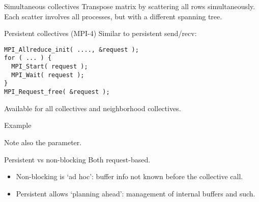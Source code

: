 \begin{numberedframe}{Simultaneous collectives}
  Transpose matrix by scattering all rows simultaneously.\\
  Each scatter involves all processes, but with a
  different spanning tree.

\end{numberedframe}


\begin{numberedframe}{Persistent collectives (MPI-4)}
  Similar to persistent send/recv:
\begin{lstlisting}
MPI_Allreduce_init( ...., &request );
for ( ... ) {
  MPI_Start( request );
  MPI_Wait( request );
}
MPI_Request_free( &request );
\end{lstlisting}
Available for all collectives and neighborhood collectives.
\end{numberedframe}

\begin{numberedframe}{Example}

  Note also the  parameter.
\end{numberedframe}

\begin{numberedframe}{Persistent vs non-blocking}
  Both request-based.
  \begin{itemize}
  \item Non-blocking is `ad hoc': buffer info not known before the collective call.
  \item Persistent allows `planning ahead': management of internal buffers and such.
  \end{itemize}
\end{numberedframe}

\begin{comment}
  \begin{numberedframe}{Problem with `progress'}
    \begin{itemize}
    \item Problem: \indexmpishow{MPI_Test} is local
    \item Something needs to force the barrier information to propagate
    \item Solution: force progress with \indexmpishow{MPI_Iprobe}
    \item Frowny face: barrier completion takes much longer than you'd expect.
    \end{itemize}
  \end{numberedframe}
\end{comment}


